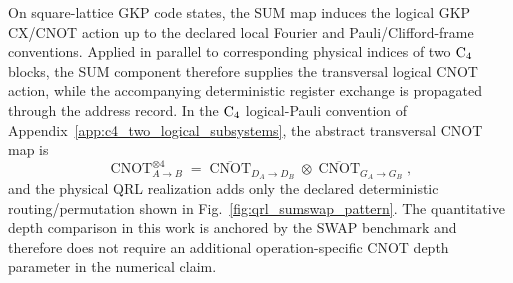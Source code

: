 \documentclass[aps,
prx,
superscriptaddress,
reprint,
longbibliography,
floatfix]{revtex4-2}
\begin{document}
On square-lattice GKP code states, the SUM map induces the logical GKP CX/CNOT action up to the declared local Fourier and Pauli/Clifford-frame conventions. Applied in parallel to corresponding physical indices of two ${\rm C_4}$ blocks, the SUM component therefore supplies the transversal logical CNOT action, while the accompanying deterministic register exchange is propagated through the address record. In the ${\rm C_4}$ logical-Pauli convention of Appendix~\ref{app:c4_two_logical_subsystems}, the abstract transversal CNOT map is
\begin{equation}
\operatorname{CNOT}^{\otimes4}_{A\rightarrow B}
=
\overline{\operatorname{CNOT}}_{D_A\rightarrow D_B}
\otimes
\overline{\operatorname{CNOT}}_{G_A\rightarrow G_B},
\end{equation}
and the physical QRL realization adds only the declared deterministic routing/permutation shown in Fig.~\ref{fig:qrl_sumswap_pattern}. The quantitative depth comparison in this work is anchored by the SWAP benchmark and therefore does not require an additional operation-specific CNOT depth parameter in the numerical claim.
\end{document}
